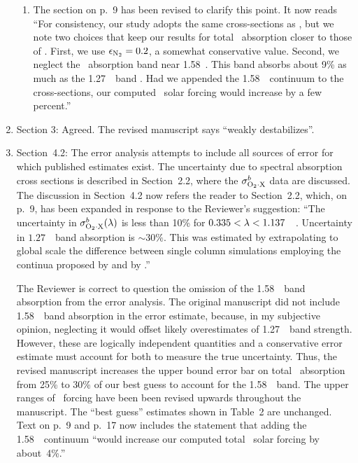 \documentclass[12pt,twoside]{article}
\begin{document}
\begin{enumerate}
\begin{enumerate}
\item The section on p.~9 has been revised to clarify this point. 
It now reads ``For consistency, our study adopts the same cross-sections as
\cite{SPS98}, but we note two choices that keep our results for total
\OdX\ absorption closer to those of \cite{MCB98}.   
First, we use $\epsilon_{\mathrm{N}_{2}} = 0.2$, a somewhat conservative value.
Second, we neglect the \OdOd\ absorption band near 1.58~\um.
This band absorbs about 9\% as much as the 1.27~\um\ band
\cite[]{MCB98}. 
Had we appended the 1.58~\um\ continuum to the \citeauthor{SPS98}
cross-sections, our computed \OdX\ solar forcing would increase by a
few percent.''
\end{enumerate}
\item Section 3: Agreed. 
The revised manuscript says ``weakly destabilizes''.
\item Section~4.2: 
The error analysis attempts to include all sources of error for which
published estimates exist. 
The uncertainty due to spectral absorption cross sections is described 
in Section~2.2, where the $\sigma^{b}_{\mathrm{O}_{2} \cdot \mathrm{X}}$ data are discussed.
The discussion in Section~4.2 now refers the reader to Section~2.2,
which, on p.~9, has been expanded in response to the Reviewer's
suggestion:   
``The uncertainty in $\sigma^{b}_{\mathrm{O}_{2} \cdot \mathrm{X}}(\lambda)$ is less than 10\% for $0.335 <
\lambda < 1.137$~\um\ \cite[]{GOB90}. 
Uncertainty in $1.27$~\um\ band absorption is $\sim 30\%$. 
This was estimated by extrapolating to global scale the difference
between single column simulations employing the continua proposed by
\citeauthor{SPS98} and by \citeauthor{MCB98}.''

The Reviewer is correct to question the omission of the 1.58~\um\ band
absorption from the error analysis.
The original manuscript did not include 1.58~\um\ band absorption in
the error estimate, because, in my subjective opinion, neglecting it
would offset likely overestimates of 1.27~\um\ band strength.
However, these are logically independent quantities and a conservative
error estimate must account for both to measure the true uncertainty.
Thus, the revised manuscript increases the upper bound error bar on
total \OdX\ absorption from 25\% to 30\% of our best guess to account
for the 1.58~\um\ band. 
The upper ranges of \OdX\ forcing have been been revised upwards
throughout the manuscript.
The ``best guess'' estimates shown in Table~2 are unchanged.
Text on p.~9 and p.~17 now includes the statement that adding the
1.58~\um\ continuum ``would increase our computed total \OdX\ solar
forcing by about~4\%.''


\end{enumerate}
\end{document}
